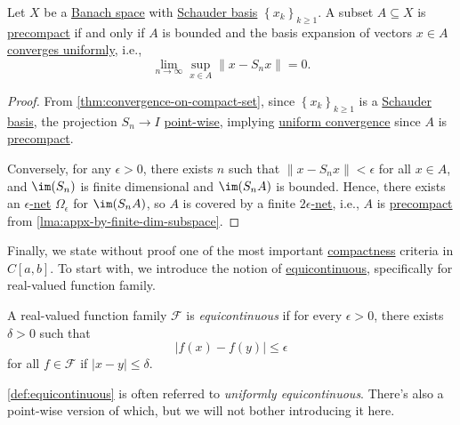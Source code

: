 \begin{corollary}
	Let \(X\) be a \hyperref[def:Banach-space]{Banach space} with \hyperref[def:Schauder-basis]{Schauder basis} \(\left\{ x_k \right\}_{k \geq 1} \). A subset \(A \subseteq X\) is \hyperref[def:precompact]{precompact} if and only if \(A\) is bounded and the basis expansion of vectors \(x\in A\) \hyperref[def:uniformly-convergence]{converges uniformly}, i.e.,
	\[
		\lim_{n \to \infty} \sup _{x\in A} \left\lVert x - S_n x\right\rVert = 0.
	\]
\end{corollary}
\begin{proof}
	From \autoref{thm:convergence-on-compact-set}, since \(\left\{ x_k \right\} _{k\geq 1}\) is a \hyperref[def:Schauder-basis]{Schauder basis}, the projection \(S_n \to I\) \hyperref[def:point-wise-convergence]{point-wise}, implying \hyperref[def:uniformly-convergence]{uniform convergence} since \(A\) is \hyperref[def:precompact]{precompact}.

	Conversely, for any \(\epsilon > 0\), there exists \(n\) such that \(\left\lVert x - S_n x\right\rVert < \epsilon \) for all \(x\in A\), and \(\im (S_n)\)  is finite dimensional and \(\im(S_n A)\) is bounded. Hence, there exists an \hyperref[def:eps-net]{\(\epsilon \)-net} \(\Omega _\epsilon \) for \(\im(S_n A)\), so \(A\) is covered by a finite \hyperref[def:eps-net]{\(2\epsilon \)-net}, i.e., \(A\) is \hyperref[def:precompact]{precompact} from \autoref{lma:appx-by-finite-dim-subspace}.
\end{proof}

Finally, we state without proof one of the most important \hyperref[def:compact]{compactness} criteria in \(C[a, b]\). To start with, we introduce the notion of \hyperref[def:equicontinuous]{equicontinuous}, specifically for real-valued function family.

\begin{definition}[Equicontinuous]\label{def:equicontinuous}
	A real-valued function family \(\mathcal{F} \) is \emph{equicontinuous} if for every \(\epsilon > 0\), there exists \(\delta > 0\) such that
	\[
		\vert f(x) - f(y) \vert \leq \epsilon
	\]
	for all \(f\in \mathcal{F} \) if \(\vert x - y \vert \leq \delta \).
\end{definition}

\begin{remark}
	\autoref{def:equicontinuous} is often referred to \emph{uniformly equicontinuous}. There's also a point-wise version of which, but we will not bother introducing it here.
\end{remark}

